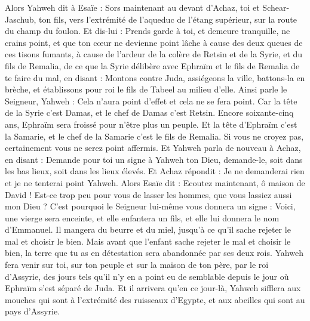 \begin{multicols}{2}
Alors Yahweh dit à Esaïe : Sors maintenant au devant d'Achaz, toi et Schear-Jaschub, ton fils, vers l'extrémité de l'aqueduc de l'étang supérieur, sur la route du champ du foulon.
Et dis-lui : Prends garde à toi, et demeure tranquille, ne crains point, et que ton cœur ne devienne point lâche à cause des deux queues de ces tisons fumants, à cause de l'ardeur de la colère de Retsin et de la Syrie, et du fils de Remalia, 
de ce que la Syrie délibère avec Ephraïm et le fils de Remalia de te faire du mal, en disant :
Montons contre Juda, assiégeons la ville, battons-la en brèche, et établissons pour roi le fils de Tabeel au milieu d'elle.
Ainsi parle le Seigneur, Yahweh : Cela n'aura point d'effet et cela ne se fera point.
Car la tête de la Syrie c'est Damas, et le chef de Damas c'est Retsin. Encore soixante-cinq ans, Ephraïm sera froissé pour n'être plus un peuple.
Et la tête d'Ephraïm c'est la Samarie, et le chef de la Samarie c'est le fils de Remalia. Si vous ne croyez pas, certainement vous ne serez point affermis.
Et Yahweh parla de nouveau à Achaz, en disant :
Demande pour toi un signe à Yahweh ton Dieu, demande-le, soit dans les bas lieux, soit dans les lieux élevés.
Et Achaz répondit : Je ne demanderai rien et je ne tenterai point Yahweh.
Alors Esaïe dit : Ecoutez maintenant, ô maison de David ! Est-ce trop peu pour vous de lasser les hommes, que vous lassiez aussi mon Dieu ?
C'est pourquoi le Seigneur lui-même vous donnera un signe : Voici, une vierge sera enceinte, et elle enfantera un fils, et elle lui donnera le nom d'Emmanuel.
Il mangera du beurre et du miel, jusqu'à ce qu'il sache rejeter le mal et choisir le bien.
Mais avant que l'enfant sache rejeter le mal et choisir le bien, la terre que tu as en détestation sera abandonnée par ses deux rois.
Yahweh fera venir sur toi, sur ton peuple et sur la maison de ton père, par le roi d'Assyrie, des jours tels qu'il n'y en a point eu de semblable depuis le jour où Ephraïm s'est séparé de Juda.
Et il arrivera qu'en ce jour-là, Yahweh sifflera aux mouches qui sont à l'extrémité des ruisseaux d'Egypte, et aux abeilles qui sont au pays d'Assyrie.

\end{multicols}
